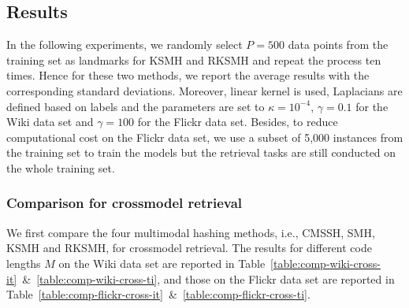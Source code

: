 \subsection{Results} %
\label{smh:exps:results_smh}

In the following experiments, we randomly select $P=500$  data points from the training set as landmarks for \mbox{KSMH} and \mbox{RKSMH} and repeat the process ten times. Hence for these two methods, we report the average results with the corresponding standard deviations. Moreover, linear kernel is used, Laplacians are defined based on labels and the parameters are set to $\kappa = 10^{-4}$, $\gamma = 0.1$ for the \mbox{Wiki} data set and $\gamma=100$ for the \mbox{Flickr} data set.  Besides, to reduce computational cost on the \mbox{Flickr} data set, we use a subset of 5,000 instances from the training set to train the models but the retrieval tasks are still conducted on the whole training set.

\subsubsection{Comparison for crossmodel retrieval}
\label{smh:exps:results:cross}

We first compare the four multimodal hashing methods, i.e., \mbox{CMSSH}, \mbox{SMH}, \mbox{KSMH} and \mbox{RKSMH}, for crossmodel retrieval. The results for different code lengths $M$ on the \mbox{Wiki} data set are reported in Table~\ref{table:comp-wiki-cross-it}~\&~\ref{table:comp-wiki-cross-ti}, and those on the \mbox{Flickr} data set are reported in Table~\ref{table:comp-flickr-cross-it}~\&~\ref{table:comp-flickr-cross-ti}.

